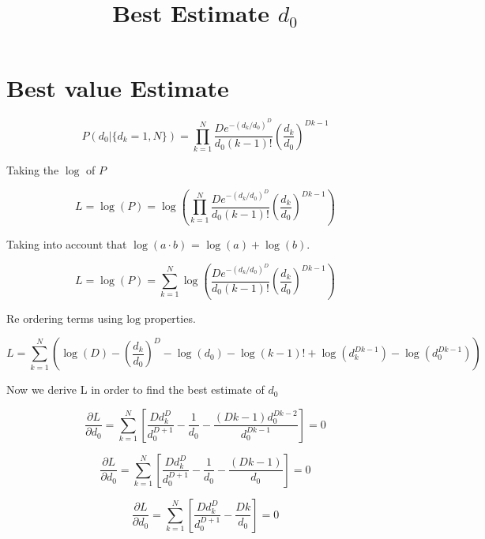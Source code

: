 \documentclass{article}
\title{Best Estimate $d_{0}$}
\theoremstyle{definition}
\theoremstyle{remark}
\begin{document}
\maketitle

\section*{Best value Estimate}

\begin{equation}
P(d_{0}|\{d_{k}= 1, N\}) = \prod _{k = 1}^{N}\dfrac{D e^{-(d_{k}/d_{0})^{D}}}{d_{0}(k-1)!}(\dfrac{d_{k}}{d_{0}})^{D k-1}
\end{equation}

Taking the $\log$ of $P$

\begin{equation}
L =  \log(P) = \log\left( \prod _{k = 1}^{N}\dfrac{D e^{-(d_{k}/d_{0})^{D}}}{d_{0}(k-1)!}(\dfrac{d_{k}}{d_{0}})^{D k-1}\right)
\end{equation}

Taking into account that $\log (a \cdot b)$ = $\log (a) + \log(b)$.

\begin{equation}
L =  \log(P) = \sum_{k=1}^{N}\log\left(\dfrac{D e^{-\left(d_{k}/d_{0} \right)^{D}}}{d_{0}(k-1)!}(\dfrac{d_{k}}{d_{0}})^{D k-1}\right)
\end{equation}

Re ordering terms using $\mathrm{log}$ properties.

\begin{equation}
L =  \sum_{k=1}^{N} \left(  \log(D) - (\dfrac{d_{k}}{d_{0}})^{D} - \log(d_{0}) - 
\log(k-1)! + \log(d_{k}^{Dk-1}) - \log(d_{0}^{Dk-1}) \right)
\end{equation}

Now we derive L in order to find the best estimate of $d_{0}$ 

\begin{equation}
\dfrac{\partial L}{ \partial d_{0}} = \sum_{k=1}^{N} \left[ \dfrac{Dd_{k}^{D}}{d_{0}^{D+1}} -
\dfrac{1}{d_{0}} - \dfrac{(Dk-1)d_{0}^{Dk-2}}{d_{0}^{Dk-1}} \right] = 0
\end{equation}

\begin{equation}
\dfrac{\partial L}{ \partial d_{0}} = \sum_{k=1}^{N} \left[ \dfrac{Dd_{k}^{D}}{d_{0}^{D+1}} -
\dfrac{1}{d_{0}} - \dfrac{(Dk-1)}{d_{0}} \right] = 0
\end{equation}

\begin{equation}
\dfrac{\partial L}{ \partial d_{0}} = \sum_{k=1}^{N} \left[ \dfrac{Dd_{k}^{D}}{d_{0}^{D+1}} -
\dfrac{Dk}{d_{0}} \right] = 0
\end{equation}
\end{document}
